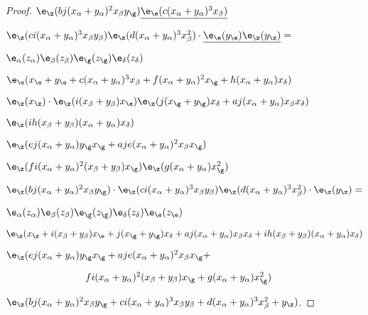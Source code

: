 \documentclass{memo-l}
\theoremstyle{definition}
\theoremstyle{remark}
\numberwithin{section}{chapter}
\numberwithin{equation}{chapter}
\begin{document}
\begin{proof}
${\e}_{{\z}}(bj(x_{\alpha}+
y_{\alpha})^{2}x_{\beta}y_{{\g}})
{\underline{{\e}_{{\e}}(c(x_{\alpha}+y_{\alpha}) ^{3}x_{\beta})}}$ 

${\e}_{{\z}}(ci(x_{\alpha}+y_{\alpha})^{3}x_{\beta}y_{\beta})
{\e}_{{\z}}(d(x_{\alpha}+y_{\alpha})^{3}x_{\beta}^{2}) \cdot
{\underline{{\e}_{{\e}}(y_{{\e}}) 
{\e}_{{\z}}(y_{{\z}})}} =$

\medpagebreak

$\e_\alpha(z_\alpha)\e_\beta(z_\beta)
{\e}_{{\g}}(z_{{\g}}){\e}_{{\delta}}(z_{{\delta}})$

${\e}_{{\e}}( x_{{\e}}+y_{{\e}}+c(x_{\alpha}+
y_{\alpha})^{3}x_{\beta}+f(x_{\alpha}+y_{\alpha})^{2}x_{{\g}}+
h(x_{\alpha}+y_{\alpha})x_{{\delta}})$

${\e}_{{\z}}(x_{{\z}}) \cdot {\e}_{{\z}}
(i(x_{\beta}+y_{\beta})x_{{\e}}){\e}_{{\z}}(j(x_{{\g}}+
y_{{\g}})x_{{\delta}}+aj(x_{\alpha}+y_\alpha)x_{\beta}x_{{\delta}})
$

${\e}_{{\z}}(ih(x_{\beta}+y_{\beta})(x_{\alpha}+
y_{\alpha})x_{{\delta}})$

${\e}_{{\z}}(ej(x_{\alpha}+y_{\alpha})y_{{\g}}x_{{\g}}+
aje(x_{\alpha}+y_{\alpha})^{2}x_{\beta}x_{{\g}})$

$
{\e}_{{\z}}(fi(x_{\alpha}+y_{\alpha})^{2}(x_{\beta}+y_{\beta})
x_{{\g}}){\e}_{{\z}}(g(x_{\alpha}+y_{\alpha})x_{{\g}}^2)$

${\e}_{{\z}}(bj(x_{\alpha}+y_{\alpha})^{2}x_{\beta}y_{{\g}})
\cdot {\e}_{{\z}}(ci(x_{\alpha}+y_{\alpha})^{3}
x_{\beta}y_{\beta}){\e}_{{\z}}(d(x_{\alpha}+y_{\alpha})^{3}
x_{\beta}^{2}) \cdot {\e}_{{\z}}(y_{\z}) =$

\medpagebreak


${\e}_{\alpha}(z_{\alpha}){\e}_{\beta}(z_{\beta})
{\e}_{{\g}}(z_{{\g}}){\e}_{{\delta}}(z_{{\delta}})
{\e}_{{\e}}(z_{{\e}})$

${\e}_{{\z}}(x_{{\z}} + i(x_{\beta}+y_{\beta})x_{{\e}} + 
j(x_{{\g}}+y_{{\g}})x_{{\delta}} + aj(x_{\alpha}+y_{\alpha})
x_{\beta}x_{{\delta}} + ih(x_{\beta}+y_{\beta})(x_{\alpha}+y_{\alpha})
x_{{\delta}})$

${\e}_{{\z}}(ej(x_{\alpha}+y_{\alpha})y_{{\g}}x_{{\g}} + 
aje(x_{\alpha}+y_{\alpha})^{2}x_{\beta}x_{{\g}} + $

$\qquad\qquad\qquad\qquad 
fi(x_{\alpha}+ y_\alpha)^2(x_\beta+y_\beta)x_\g + g(x_\alpha+ y_\alpha)x_\g^2)$

${\e}_{{\z}}(bj(x_{\alpha}+y_{\alpha})^{2}x_{\beta}y_{{\g}} 
+ ci(x_{\alpha}+y_{\alpha})^{3}x_{\beta}y_{\beta} + 
d(x_{\alpha}+y_{\alpha})^{3}x_{\beta}^{2} + y_{{\z}})$.
\hfill 
\end{proof}
{\medskip}
\end{document}

